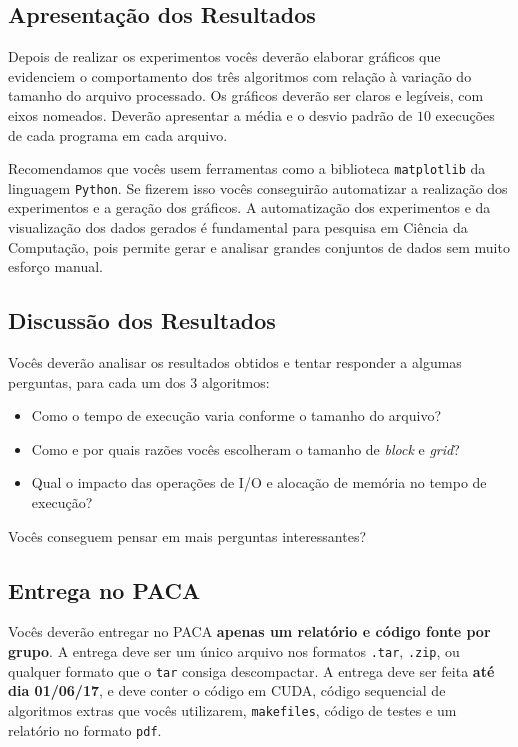 \documentclass[final,12pt,a4paper]{elsarticle}
\begin{document}
\subsection{Apresentação dos Resultados}

Depois de realizar os experimentos vocês deverão elaborar gráficos que
evidenciem o comportamento dos três algoritmos com relação à variação do
tamanho do arquivo processado. Os gráficos deverão ser claros e legíveis, com
eixos nomeados. Deverão apresentar a média e o desvio padrão de $10$ execuções
de cada programa em cada arquivo.

Recomendamos que vocês usem ferramentas como a biblioteca \texttt{matplotlib}
da linguagem \texttt{Python}. Se fizerem isso vocês conseguirão automatizar a
realização dos experimentos e a geração dos gráficos. A automatização dos
experimentos e da visualização dos dados gerados é fundamental para pesquisa em
Ciência da Computação, pois permite gerar e analisar grandes conjuntos de dados
sem muito esforço manual.

\subsection{Discussão dos Resultados}

Vocês deverão analisar os resultados obtidos e tentar responder a algumas
perguntas, para cada um dos 3 algoritmos:

\begin{itemize}
    \item Como o tempo de execução varia conforme o tamanho do arquivo?
    \item Como e por quais razões vocês escolheram o tamanho de \textit{block}
        e \textit{grid}?
    \item Qual o impacto das operações de I/O e alocação de memória no tempo de
    execução?
\end{itemize}

Vocês conseguem pensar em mais perguntas interessantes?

\subsection{Entrega no PACA}

Vocês deverão entregar no PACA \textbf{apenas um relatório e código fonte por
grupo}. A entrega deve ser um único arquivo nos formatos \texttt{.tar},
\texttt{.zip}, ou qualquer formato que o \texttt{tar} consiga descompactar.
A entrega deve ser feita \textbf{até dia 01/06/17}, e deve conter o código
em CUDA, código sequencial de algoritmos extras que vocês utilizarem, \texttt{makefiles},
código de testes e um relatório no formato \texttt{pdf}.
\end{document}

